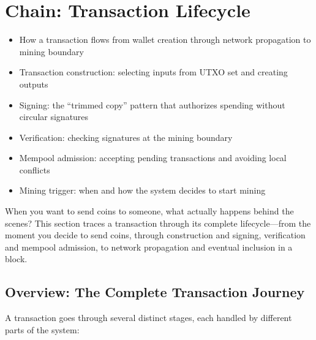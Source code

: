 \chapter{Chain: Transaction Lifecycle}
\label{ch:transaction-lifecycle}

\begin{learnbox}
\begin{itemize}
  \item How a transaction flows from wallet creation through network propagation to mining boundary
  \item Transaction construction: selecting inputs from UTXO set and creating outputs
  \item Signing: the ``trimmed copy'' pattern that authorizes spending without circular signatures
  \item Verification: checking signatures at the mining boundary
  \item Mempool admission: accepting pending transactions and avoiding local conflicts
  \item Mining trigger: when and how the system decides to start mining
\end{itemize}
\end{learnbox}

When you want to send coins to someone, what actually happens behind the scenes? This section traces a transaction through its complete lifecycle---from the moment you decide to send coins, through construction and signing, verification and mempool admission, to network propagation and eventual inclusion in a block.

\section{Overview: The Complete Transaction Journey}
\label{sec:ch09-5-overview}

A transaction goes through several distinct stages, each handled by different parts of the system:

